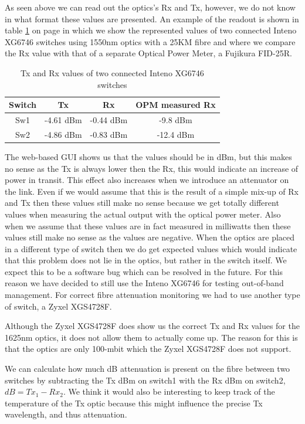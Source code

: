 \documentclass{article}
\begin{document}
As seen above we can read out the optics’s Rx and Tx, however, we do not know in what format these values are presented. An example of the readout is shown in table \ref{tab:crazy-inteno} on page \pageref{tab:crazy-inteno} in which we show the represented values of two connected Inteno XG6746 switches using 1550nm optics with a 25KM fibre and where we compare the Rx value with that of a separate Optical Power Meter, a Fujikura FID-25R.

\begin{table}[h]
\centering
\begin{tabular}{|c|c|c|c|}
\hline 
\textbf{Switch} & \textbf{Tx} & \textbf{Rx} & \textbf{OPM measured Rx}\\ 
\hline 
Sw1 & -4.61 dBm & -0.44 dBm & -9.8 dBm\\ 
\hline 
Sw2 & -4.86 dBm & -0.83 dBm  & -12.4 dBm \\ 
\hline 
\end{tabular} 
\caption{Tx and Rx values of two connected Inteno XG6746 switches}
\label{tab:crazy-inteno}
\end{table}

The web-based GUI shows us that the values should be in dBm, but this makes no sense as the Tx is always lower then the Rx, this would indicate an increase of power in transit. This effect also increases when we introduce an attenuator on the link. Even if we would assume that this is the result of a simple mix-up of Rx and Tx then these values still make no sense because we get totally different values when measuring the actual output with the optical power meter. Also when we assume that these values are in fact measured in milliwatts then these values still make no sense as the values are negative. When the optics are placed in a different type of switch then we do get expected values which would indicate that this problem does not lie in the optics, but rather in the switch itself. We expect this to be a software bug which can be resolved in the future. For this reason we have decided to still use the Inteno XG6746 for testing out-of-band management. For correct fibre attenuation monitoring we had to use another type of switch, a Zyxel XGS4728F.

Although the Zyxel XGS4728F does show us the correct Tx and Rx values for the 1625nm optics, it does not allow them to actually come up. The reason for this is that the optics are only 100-mbit which the Zyxel XGS4728F does not support. 

We can calculate how much dB attenuation is present on the fibre between two switches by subtracting the Tx dBm on switch1 with the Rx dBm on switch2, $dB=Tx_1-Rx_2$. We think it would also be interesting to keep track of the temperature of the Tx optic because this might influence the precise Tx wavelength, and thus attenuation.
\end{document}
